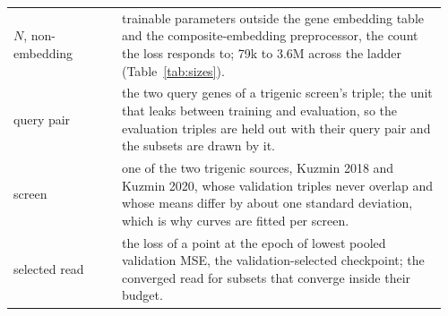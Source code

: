 \begin{table}[H]
\begin{tabular}{p{0.24\linewidth}p{0.72\linewidth}}
$N$, non-embedding & trainable parameters outside the gene embedding table and the composite-embedding preprocessor, the count the loss responds to; 79k to 3.6M across the ladder (Table~\ref{tab:sizes}). \\
query pair & the two query genes of a trigenic screen's triple; the unit that leaks between training and evaluation, so the evaluation triples are held out with their query pair and the subsets are drawn by it. \\
screen & one of the two trigenic sources, Kuzmin 2018 and Kuzmin 2020, whose validation triples never overlap and whose means differ by about one standard deviation, which is why curves are fitted per screen. \\
selected read & the loss of a point at the epoch of lowest pooled validation MSE, the validation-selected checkpoint; the converged read for subsets that converge inside their budget. \\
\bottomrule
\end{tabular}
\end{table}
